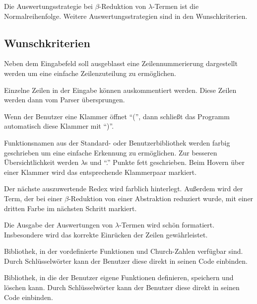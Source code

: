 \documentclass[parskip=full,11pt,twoside]{scrartcl}
\begin{document}
Die Auswertungsstrategie bei $\beta$-Reduktion von $\lambda$-Termen ist die Normalreihenfolge. Weitere Auswertungsstrategien sind in den Wunschkriterien.


\newpage
\subsection{Wunschkriterien}

Neben dem Eingabefeld soll ausgeblasst eine Zeilennummerierung dargestellt werden um eine einfache Zeilenzuteilung zu ermöglichen.

Einzelne Zeilen in der Eingabe können auskommentiert werden. Diese Zeilen werden dann vom Parser übersprungen.

Wenn der Benutzer eine Klammer öffnet \enquote{(}, dann schließt das Programm automatisch diese Klammer mit \enquote{)}.

Funktionsnamen aus der Standard- oder Benutzerbibliothek werden farbig geschrieben um eine einfache Erkennung zu ermöglichen. Zur besseren Übersichtlichkeit werden $\lambda$s  und \enquote{.} Punkte fett geschrieben. Beim Hovern über einer Klammer wird das entsprechende Klammerpaar markiert.

Der nächste auszuwertende Redex wird farblich hinterlegt.
Außerdem wird der Term, der bei einer $\beta$-Reduktion von einer Abstraktion reduziert wurde, mit einer dritten Farbe im nächsten Schritt markiert.

Die Ausgabe der Auswertungen von $\lambda$-Termen wird schön formatiert. Insbesondere wird das korrekte Einrücken der Zeilen gewährleistet.

Bibliothek, in der vordefinierte Funktionen und Church-Zahlen verfügbar sind. Durch Schlüsselwörter kann der Benutzer diese direkt in seinen Code einbinden.

Bibliothek, in die der Benutzer eigene Funktionen definieren, speichern und löschen kann. Durch Schlüsselwörter kann der Benutzer diese direkt in seinen Code einbinden.
\end{document}

